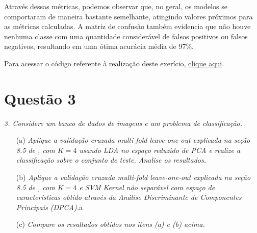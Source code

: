\documentclass[]{abntex2}
\begin{document}
Através dessas métricas, podemos observar que, no geral, os modelos se comportaram de maneira bastante semelhante, atingindo valores próximos para as métricas calculadas. A matriz de confusão também evidencia que não houve nenhuma classe com uma quantidade considerável de falsos positivos ou falsos negativos, resultando em uma ótima acurácia média de 97\%.

Para acessar o código referente à realização deste exerício, \href{https://github.com/lorran-araujo/LNCC/blob/main/disciplinas/redes-neurais/codes/lista3/exercicio2.ipynb}{clique aqui}.


\section*{\textbf{Questão 3}}

\textit{3. Considere um banco de dados de imagens e um problema de classificação.}

\begin{enumerate}
    \item[(a)] \textit{ Aplique a validação cruzada multi-fold leave-one-out explicada na seção 8.5 de \cite{book}, com $K = 4$ usando LDA no espaço reduzido de PCA e realize a classificação sobre o conjunto de teste. Analise os resultados.}
    
    \item[(b)] \textit{ Aplique a validação cruzada multi-fold leave-one-out explicada na seção 8.5 de \cite{book}, com $K = 4$ e SVM Kernel não separável com espaço de características obtido através da Análise Discriminante de Componentes Principais (DPCA).}a
    
    \item[(c)] \textit{ Compare os resultados obtidos nos itens (a) e (b) acima.}
\end{enumerate}
\end{document}
